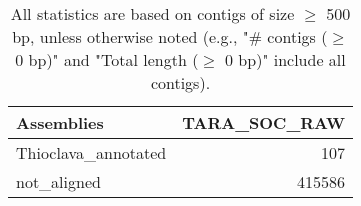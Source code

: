 \documentclass[12pt,a4paper]{article}
\begin{document}
\begin{table}[ht]
\begin{center}
\caption{All statistics are based on contigs of size $\geq$ 500 bp, unless otherwise noted (e.g., "\# contigs ($\geq$ 0 bp)" and "Total length ($\geq$ 0 bp)" include all contigs).}
\begin{tabular}{|l*{1}{|r}|}
\hline
Assemblies & TARA\_SOC\_RAW \\ \hline
Thioclava\_annotated & 107 \\ \hline
not\_aligned & 415586 \\ \hline
\end{tabular}
\end{center}
\end{table}
\end{document}
